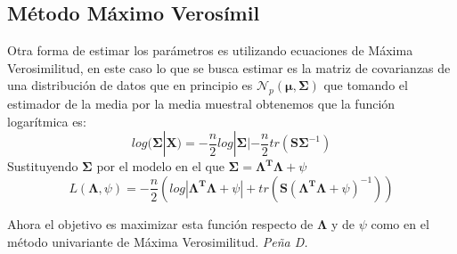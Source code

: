 \subsection{Método Máximo Verosímil}

\noindent Otra forma de estimar los parámetros es utilizando ecuaciones de Máxima Verosimilitud, en este caso lo que se busca estimar es la matriz de covarianzas de una distribución de datos que en principio es $\mathcal{N}_p(\mathbf{\mu},\mathbf{\Sigma})$ que tomando el estimador de la media por la media muestral obtenemos que la función logarítmica es: 
\begin{equation}
log(\mathbf{\Sigma}|\textbf{X})=-\dfrac{n}{2}log|\mathbf{\Sigma}|-\dfrac{n}{2}tr(\mathbf{S\Sigma}^{-1})
\end{equation}
\noindent Sustituyendo $\mathbf{\Sigma}$ por el modelo en el que $\mathbf{\Sigma}=\mathbf{\mathbf{\Lambda}^T\mathbf{\Lambda}}+\psi$
\begin{equation}
L(\mathbf{\Lambda},\psi)=-\dfrac{n}{2}(log|\mathbf{\mathbf{\Lambda}^T\mathbf{\Lambda}}+\psi| +tr(\textbf{S}(\mathbf{\mathbf{\Lambda}^T\mathbf{\Lambda}}+\psi)^{-1}))
\end{equation}

\noindent Ahora el objetivo es maximizar esta función respecto de $\mathbf{\Lambda}$  y de $\psi$ como en el método univariante de Máxima Verosimilitud. \emph{Peña D.}\cite{Peña 2002} 


















